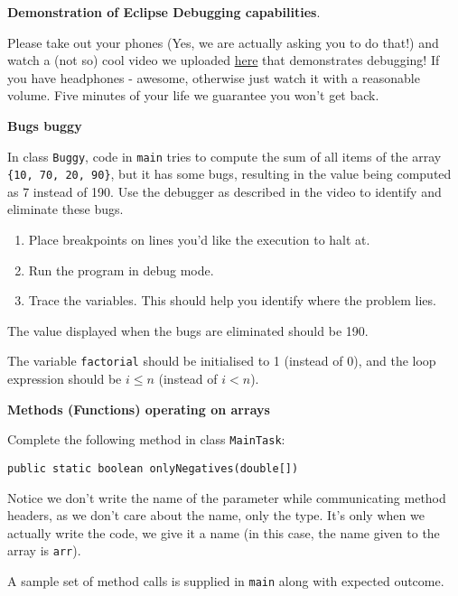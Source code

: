 \begin{questions}
\vskip 0.5cm

\question \textbf{Demonstration of Eclipse Debugging capabilities}.

Please take out your phones (Yes, we are actually asking you to do that!) and watch a (not so) cool video we uploaded \href{https://www.youtube.com/watch?v=NQTQVYhmsL0}{here} that demonstrates debugging! If you have headphones - awesome, otherwise just watch it with a reasonable volume. Five minutes of your life we guarantee you won't get back.

\vskip 0.5cm

\question \textbf{Bugs buggy}

In class \texttt{Buggy}, code in \texttt{main} tries to compute the sum of all items of the array \texttt{\{10, 70, 20, 90\}}, but it has some bugs, resulting in the value being computed as 7 instead of 190. Use the debugger as described in the video to identify and eliminate these bugs.

\begin{enumerate}
\item Place breakpoints on lines you'd like the execution to halt at.	
\item Run the program in debug mode.
\item Trace the variables. This should help you identify where the problem lies.
\end{enumerate}

The value displayed when the bugs are eliminated should be 190.

\begin{solution}
The variable \texttt{factorial} should be initialised to 1 (instead of 0), and the loop expression should be $i \leq n$ (instead of $i < n$).
\end{solution}

\newpage

\question \textbf{Methods (Functions) operating on arrays}

\vskip 0.2cm
Complete the following method in class \texttt{MainTask}:

\texttt{public static boolean onlyNegatives(double[])} 

\vskip 0.2cm
Notice we don't write the name of the parameter while communicating method headers, as we don't care about the name, only the type. It's only when we actually write the code, we give it a name (in this case, the name given to the array is \texttt{arr}).

A sample set of method calls is supplied in \texttt{main} along with expected outcome. 


\end{questions}
